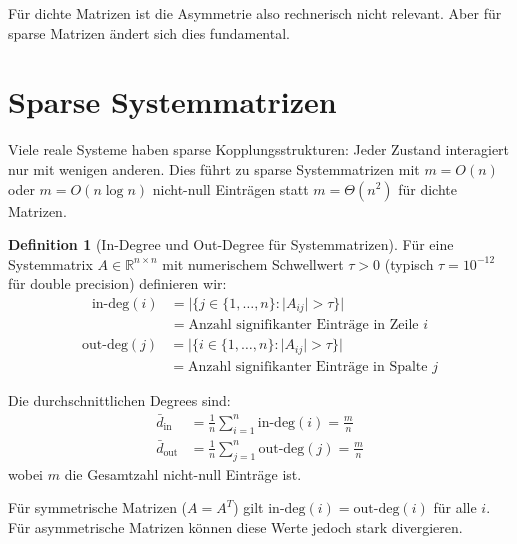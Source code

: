 ﻿\documentclass[a4paper,12pt]{report}
\theoremstyle{definition}
\newtheorem{definition}{Definition}
\begin{document}
	Für dichte Matrizen ist die Asymmetrie also rechnerisch nicht relevant. Aber für sparse Matrizen ändert sich dies fundamental.
	
	\section{Sparse Systemmatrizen}
	
	Viele reale Systeme haben sparse Kopplungsstrukturen: Jeder Zustand interagiert nur mit wenigen anderen. Dies führt zu sparse Systemmatrizen mit $m = O(n)$ oder $m = O(n \log n)$ nicht-null Einträgen statt $m = \Theta(n^2)$ für dichte Matrizen.
	
	\begin{definition}[In-Degree und Out-Degree für Systemmatrizen]
		Für eine Systemmatrix $A \in \mathbb{R}^{n \times n}$ mit numerischem Schwellwert $\tau > 0$ (typisch $\tau = 10^{-12}$ für double precision) definieren wir:
		\begin{align}
			\text{in-deg}(i) &= |\{j \in \{1,\ldots,n\} : |A_{ij}| > \tau\}| \\
			&= \text{Anzahl signifikanter Einträge in Zeile } i
		\end{align}
		\begin{align}
			\text{out-deg}(j) &= |\{i \in \{1,\ldots,n\} : |A_{ij}| > \tau\}| \\
			&= \text{Anzahl signifikanter Einträge in Spalte } j
		\end{align}
		
		Die durchschnittlichen Degrees sind:
		\begin{align}
			\bar{d}_{\text{in}} &= \frac{1}{n} \sum_{i=1}^{n} \text{in-deg}(i) = \frac{m}{n} \\
			\bar{d}_{\text{out}} &= \frac{1}{n} \sum_{j=1}^{n} \text{out-deg}(j) = \frac{m}{n}
		\end{align}
		wobei $m$ die Gesamtzahl nicht-null Einträge ist.
	\end{definition}
	
	Für symmetrische Matrizen ($A = A^T$) gilt $\text{in-deg}(i) = \text{out-deg}(i)$ für alle $i$. Für asymmetrische Matrizen können diese Werte jedoch stark divergieren.
	
\end{document}
